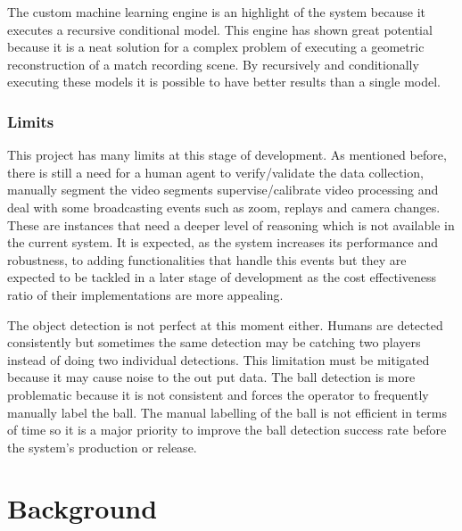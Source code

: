 \documentclass[
    11pt,
    twoside
]{report}
\begin{document}
The custom machine learning engine is an highlight of the system because it executes a recursive conditional model. This engine has shown great potential because it is a neat solution for a complex problem of executing a geometric reconstruction of a match recording scene. By recursively and conditionally executing these models it is possible to have better results than a single model.




\subsection{Limits}


This project has many limits at this stage of development. As mentioned before, there is still a need for a human agent to verify/validate the data collection, manually segment the video segments supervise/calibrate video processing and deal with some broadcasting events such as zoom, replays and camera changes. These are instances that need a deeper level of reasoning which is not available in the current system. It is expected, as the system increases its performance and robustness, to adding functionalities that handle this events but they are expected to be tackled in a later stage of development as the cost effectiveness ratio of their implementations are more appealing.


The object detection is not perfect at this moment either. Humans are detected consistently but sometimes the same detection may be catching two players instead of doing two individual detections. This limitation must be mitigated because it may cause noise to the out put data. The ball detection is more problematic because it is not consistent and forces the operator to frequently manually label the ball. The manual labelling of the ball is not efficient in terms of time so it is a major priority to improve the ball detection success rate before the system's production or release.

\chapter{Background}
\end{document}
